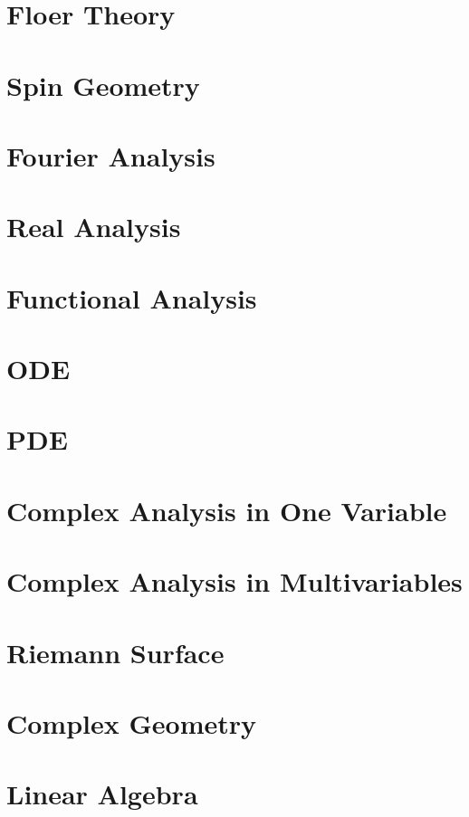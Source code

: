 \documentclass{ModulEN}
\begin{document}
	\part{Floer Theory}
	
	\part{Spin Geometry}
	
	\part{Fourier Analysis}
	
	\part{Real Analysis}
	
	\part{Functional Analysis}
	
	\part{ODE}
	
	\part{PDE}
	
	\part{Complex Analysis in One Variable}
	
	\part{Complex Analysis in Multivariables}
	
	\part{Riemann Surface}
	
		\label{Riemann-Surface}
	
	\part{Complex Geometry}
	
	\part{Linear Algebra}
	
\end{document}
